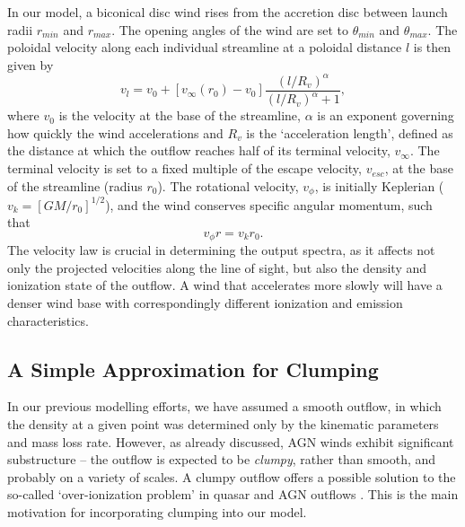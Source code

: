 \documentclass[useAMS,usenatbib]{mn2e_x}
\begin{document}
In our model, a biconical disc wind rises from the accretion 
disc between launch radii $r_{min}$ and $r_{max}$.
The opening angles of the wind are set to $\theta_{min}$ and $\theta_{max}$.
The poloidal velocity along each individual streamline at a poloidal distance $l$ 
is then given by
\begin{equation}
v_l=v_0+\left[v_{\infty}(r_0)-v_0\right]\frac{\left(l/R_v\right)^{\alpha}}{\left(l/R_v\right)^{\alpha}+1},
\label{v_law}
\end{equation}
where $v_0$ is the velocity at the base of the streamline, $\alpha$ is
an exponent governing how quickly the wind accelerations and 
$R_v$ is the `acceleration length', defined as the distance at which
the outflow reaches half of its terminal velocity, $v_{\infty}$.
The terminal velocity is set to a fixed multiple of the escape
velocity, $v_{esc}$, at the base of the streamline (radius $r_0$).
The rotational velocity, $v_{\phi}$, is initially Keplerian ($v_k = [GM/r_0]^{1/2}$),
and the wind conserves specific angular momentum, such that 
\begin{equation}
v_{\phi} r = v_k r_0.
\label{v_law}
\end{equation}
The velocity law is crucial in determining the output spectra,
as it affects not only the projected velocities along the line of sight,
but also the density and ionization state of the outflow.
A wind that accelerates more slowly will have a denser wind base
with correspondingly different ionization and emission characteristics.

\subsection{A Simple Approximation for Clumping}

In our previous modelling efforts, we have assumed a smooth outflow, 
in which the density at a given point was determined only by the 
kinematic parameters and mass loss rate. However, as already discussed,
AGN winds exhibit significant substructure -- the outflow is expected to be
{\em clumpy}, rather than smooth, and probably on a variety of scales. 
A clumpy outflow offers a possible solution to the so-called `over-ionization problem' in 
quasar and AGN outflows \citep{hamann2013}. This is the main motivation for incorporating 
clumping into our model.
\end{document}
